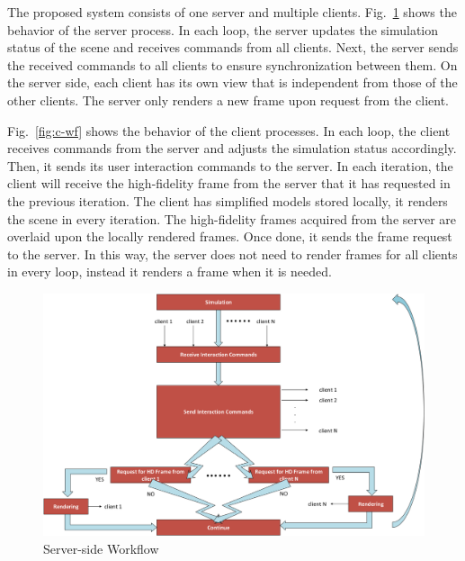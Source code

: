 The proposed system consists of one server and multiple clients.
Fig.~\ref{fig:s-wf} shows the behavior of the server process.
In each loop, the server updates the simulation status of the scene and receives commands from all clients.
Next, the server sends the received commands to all clients to ensure synchronization between them.
On the server side, each client has its own view that is independent from those of the other clients.
The server only renders a new frame upon request from the client.

Fig.~\ref{fig:c-wf} shows the behavior of the client processes. In each loop, the client receives commands from the server and adjusts the simulation status accordingly. Then, it sends its user interaction commands to the server. In each iteration, the client will receive the high-fidelity frame from the server that it has requested in the previous iteration. The client has simplified models stored locally, it renders the scene in every iteration. The high-fidelity frames acquired from the server are overlaid upon the locally rendered frames. Once done, it sends the frame request to the server. In this way, the server does not need to render frames for all clients in every loop, instead it renders a frame when it is needed.

\begin{figure}[!htbp]
	\includegraphics[width=\textwidth]{figures/workflow_server-eps-converted-to.pdf}
	\caption{Server-side Workflow}
	\label{fig:s-wf}
\end{figure}

